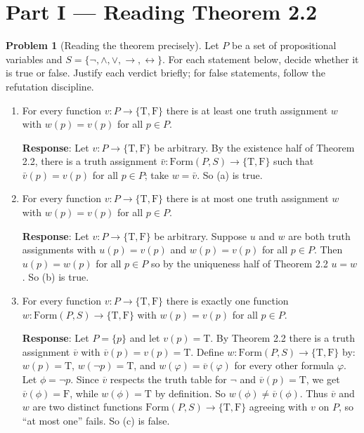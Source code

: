 \documentclass[11pt]{article}
\newcommand{\Form}{\mathrm{Form}}
\newcommand{\T}{\mathrm{T}}
\newcommand{\F}{\mathrm{F}}
\newcommand{\TF}{\{\T,\F\}}
\newcommand{\ext}[1]{\overline{#1}}
\newcommand{\Sfive}{\{\lnot,\land,\lor,\to,\leftrightarrow\}}
\theoremstyle{definition}
\newtheorem{problem}{Problem}
\begin{document}

\section*{Part I --- Reading Theorem 2.2}

\begin{problem}[Reading the theorem precisely]Let $P$ be a set of propositional variables and $S = \Sfive$. For each statement
below, decide whether it is true or false. Justify each verdict briefly; for false
statements, follow the refutation discipline.

\begin{enumerate}
\item[(a)] For every function $v\colon P\to\TF$ there is at least one truth assignment $w$ with $w(p)=v(p)$ for all $p\in P$.

\textbf{Response}:
Let $v\colon P\to\TF$ be arbitrary.
By the existence half of Theorem 2.2, there is a truth assignment $\bar{v}:\Form(P,S)\to\TF$ such that $\bar{v}(p) = v(p)$ for all $p \in P$; take $w = \bar{v}$.
So (a) is true.


\item[(b)] For every function $v\colon P\to\TF$ there is at most one truth assignment $w$ with $w(p)=v(p)$ for all $p\in P$.

\textbf{Response}:
Let $v\colon P\to\TF$ be arbitrary.
Suppose $u$ and $w$ are both truth assignments with $u(p) = v(p)$ and $w(p) = v(p)$ for all $p \in P$.
Then $u(p) = w(p)$ for all $p \in P$ so by the uniqueness half of Theorem 2.2 $u = w$.
So (b) is true.


\item[(c)] For every function $v\colon P\to\TF$ there is exactly one function $w\colon\Form(P,S)\to\TF$ with $w(p)=v(p)$ for all $p\in P$.

\textbf{Response}:
Let $P = \{ p \}$ and let $v(p) = \T$.
By Theorem 2.2 there is a truth assignment $\ext{v}$ with $\ext{v}(p) = v(p) = \T$.
Define $w \colon \Form(P, S) \to \TF$ by: $w(p) = \T$, $w(\neg p) = \T$, and $w(\varphi) = \ext{v}(\varphi)$ for every other formula $\varphi$.
Let $\phi = \neg p$. Since $\ext{v}$ respects the truth table for $\neg$ and $\ext{v}(p) = \T$, we get $\ext{v}(\phi) = \F$, while $w(\phi) = \T$ by definition. So $w(\phi) \neq \ext{v}(\phi)$.
Thus $\ext{v}$ and $w$ are two distinct functions $\Form(P,S)\to\TF$ agreeing with $v$ on $P$, so ``at most one'' fails.
So (c) is false.


\end{enumerate}
\end{problem}
\end{document}
